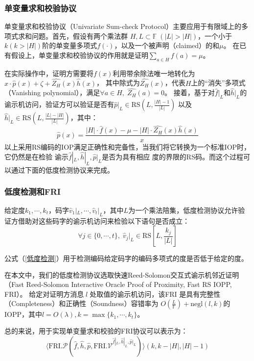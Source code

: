 \documentclass[zihao=-4]{ctexart}
\begin{document}
\begin{spacing}{1.5}
\subsubsection{单变量求和校验协议}
单变量求和校验协议（Univariate Sum-check Protocol）主要应用于有限域上的多项式求和问题。首先，假设有两个乘法群
$H, L\subset \mathbb{F}\;(|L|>|H|)$，一个小于$k(k>|H|)$阶的单变量多项式$f(\cdot)$，以及一个被声明（claimed）的和$\mu$。
在已有假设上，单变量求和校验协议的作用就是证明$\sum_{a\in H}f(a)=\mu$。\par
在实际操作中，证明方需要将$f(x)$利用带余除法唯一地转化为$x\cdot\hat{p}(x)+\zeta+\hat{Z_H}(x)\hat{h}(x)$，
其中除式为$\hat{Z_H}(x)$，代表$H$上的“消失”多项式（Vanishing polynomial），满足$\forall a\in H,\;\hat{Z_H}(a)=0$。
接着，基于对$\hat{f}|_L$和$\hat{h}|_L$的谕示机访问，验证方可以验证是否有$\hat{p}|_L\in\text{RS}(L,\frac{|H|-1}{|L|})$
以及$\hat{h}|_L\in\text{RS}(L,\frac{|L|-|H|}{|L|})$，其中：
\begin{equation}\hat{p}(x)=\dfrac{|H|\cdot\hat{f}(x)-\mu-|H|\cdot\hat{Z_H}(x)\hat{h}(x)}{x}\end{equation}
以上采用RS编码的IOP满足正确性和完备性\cite{six}，当我们将它转换为一个标准IOP时，它仍然是在检验
谕示$\hat{f}|_L,\hat{h}|_L,\hat{p}|_L$是否为具有相应
度的界限的RS码。而这个过程可以通过下面的低度检测协议来完成。

\subsubsection{低度检测和FRI}
给定度$k_1,\cdots,k_t$，码字$\hat{v}_1|_L,\cdots,\hat{v}_t|_L$，其中$L$为一个乘法陪集，低度检测协议允许验证方借助对这些码字的谕示机访问来检验以下语句是否成立：
\begin{equation}\forall j\in\{0,\cdots,t\},\;\hat{v}_j|_L\in\text{RS}[L,\frac{k_j}{|L|}]\label{低度检测}\end{equation}\par
公式（\ref{低度检测}）用于检测编码给定码字的编码多项式的度是否低于给定的度。\par
在本文中，我们的低度检测协议选取快速Reed-Solomon交互式谕示机邻近证明\cite{three}（Fast Reed-Solomon Interactive Oracle Proof of Proximity, Fast RS IOPP, FRI）。
给定对证明方消息$\;l\;$处取值的谕示机访问，该FRI 是具有完整性（Completeness）和正确性（Soundness）容错率为
$O(\frac{L}{\mathbb{F}})+\text{negl}(l,k)$的IOPP，其中$l=O(\lambda),k=\max\{k_1,\cdots,k_t\}$。\par
总的来说，用于实现单变量求和校验的FRI协议可以表示为：
\begin{equation}\langle \text{FRI}.\mathcal{P}(\hat{f},\hat{h},\hat{p},\text{FRI}.\mathcal{V}^{\hat{f}|_L,\hat{h}|_L,\hat{p}|_L})\rangle(k,k-|H|,|H|-1)\end{equation}\par


\end{spacing}
\end{document}
